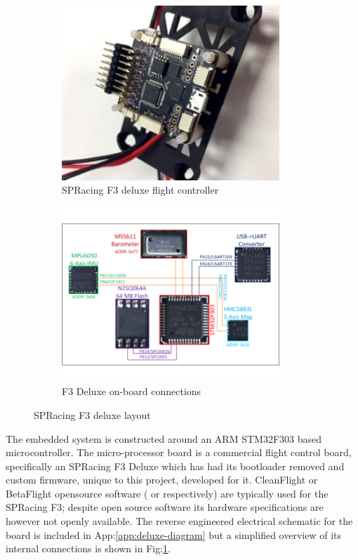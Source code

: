 \par
\begin{figure}[htbp]
\begin{subfigure}{0.5\textwidth}
\centering
\includegraphics[width=0.9\textwidth]{figs/f3-deluxe}
\caption{SPRacing F3 deluxe flight controller}
\end{subfigure}
\begin{subfigure}{0.5\textwidth}
\centering
\includegraphics[width=0.9\textwidth]{figs/f3-deluxe-board}
\caption{F3 Deluxe on-board connections}
\label{fig:f3-deluxe-board}
\end{subfigure}
\caption{SPRacing F3 deluxe layout}
\label{fig:f3-deluxe-layout}
\vspace{-10pt}
\end{figure}
The embedded system is constructed around an ARM STM32F303\cite{stm32f303} based microcontroller. The micro-processor board is a commercial flight control board, specifically an SPRacing F3 Deluxe\cite{spracing} which has had its bootloader removed and custom firmware, unique to this project, developed for it. CleanFlight or BetaFlight opensource software (\cite{cleanflight} or \cite{betaflight} respectively) are typically used for the SPRacing F3; despite open source software its hardware specifications are  however not openly available. The reverse engineered electrical schematic for the board is included in App:\ref{app:deluxe-diagram} but a simplified overview of its internal connections is shown in Fig:\ref{fig:f3-deluxe-board}.
